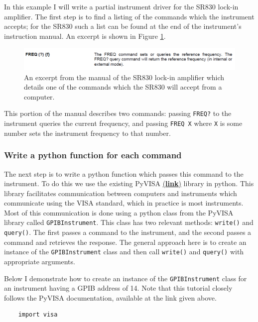 \documentclass[edeposit,fullpage,draftthesis]{uiucthesis2009}
\begin{document}
\begin{appendices}
        In this example I will write a partial instrument driver for the SR830 lock-in amplifier. The first
        step is to find a listing of the commands which the instrument accepts; for the SR830 such a list
        can be found at the end of the instrument's instruction manual. An excerpt is shown in Figure \ref{fig:sr830manual}.
        \begin{figure}
            \centering
            \includegraphics[width=\linewidth]{images/python/sr830.png}
            \caption[Excerpt from the SR830 manual]{
                An excerpt from the manual of the SR830 lock-in amplifier which details one of the 
                commands which the SR830 will accept from a computer.
            }
            \label{fig:sr830manual}
        \end{figure}
        This portion of the manual describes two commands: passing \texttt{FREQ?} to the instrument queries 
        the current frequency, and passing \texttt{FREQ X} where \texttt{X} is some number sets the instrument
        frequency to that number.
    
    \subsubsection*{Write a python function for each command}
    
    The next step is to write a python function which passes this command to the instrument.
    To do this we use the existing PyVISA \href{https://pyvisa.readthedocs.io/en/stable/}{(\textbf{link})} library in python.
    This library facilitates communication between computers and instruments which communicate using the VISA
    standard, which in practice is most instruments. Most of this communication is done using a python class
    from the PyVISA library called \texttt{GPIBInstrument}. This class has two relevant methods: \texttt{write()} and
    \texttt{query()}. The first passes a command to the instrument, and the second passes a command and retrieves
    the response. The general approach here is to create an instance of the \texttt{GPIBInstrument} class 
    and then call \texttt{write()} and \texttt{query()} with appropriate arguments.
    
    Below I demonstrate how to create an instance of the \texttt{GPIBInstrument} class for 
    an instrument having a GPIB address of 14. Note that this tutorial closely follows the 
    PyVISA documentation, available at the link given above.
    \begin{verbatim}
    import visa
    

\end{verbatim}
\end{appendices}
\end{document}
